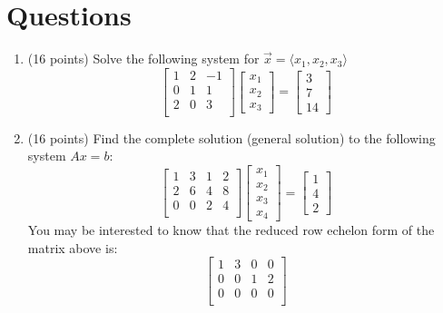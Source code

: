 \documentclass[12pt, a4paper]{article}
\theoremstyle{break}
\begin{document}
\section{Questions}
\begin{enumerate}
\item (16  points) Solve the following system for $\vec{x}=\langle x_1,x_2,x_3 \rangle$
\begin{equation}
\begin{bmatrix}
1&2&-1 \\
0&1&1 \\
2&0&3 \\
\end{bmatrix}
\begin{bmatrix}
x_1\\
x_2 \\
x_3 
\end{bmatrix}=
\begin{bmatrix}
3\\
7\\
14 
\end{bmatrix} \nonumber
\end{equation} 
\newpage
\item (16 points)  Find the complete solution (general solution) to the following system $Ax=b$:
\begin{equation}
\begin{bmatrix}
1 & 3 & 1 &2  \\
2&6 &4 & 8 \\
0&0&2&4 \\
\end{bmatrix}
\begin{bmatrix}
x_1\\
x_2 \\
x_3 \\
x_4 
\end{bmatrix}=
\begin{bmatrix}
1 \\
4 \\
2 
\end{bmatrix} \nonumber
\end{equation}
You may be interested to know that the reduced row echelon form of the matrix above is:
$$
\begin{bmatrix}
1 & 3 & 0 &0  \\
0&0 &1 & 2 \\
0&0&0&0 \\
\end{bmatrix} \nonumber
$$
\newpage


\end{enumerate}
\end{document}

